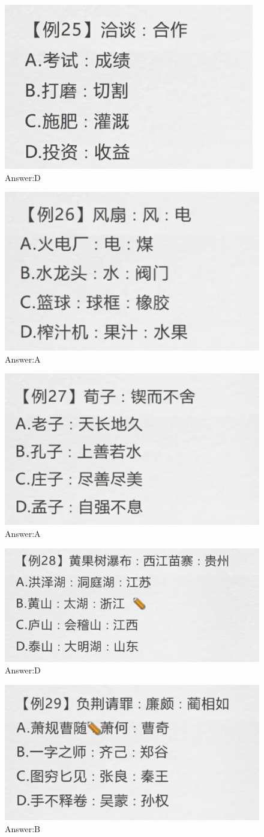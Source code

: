 \documentclass{article}
\numberwithin{equation}{section}						%
\numberwithin{figure}{section}							%
\begin{document}
\begin{sloppypar}
\begin{figure}[H]
     \centering
     \includegraphics[width=0.4\linewidth]{125.png}
		\caption{Answer:D}
\end{figure}


\begin{figure}[H]
     \centering
     \includegraphics[width=0.4\linewidth]{126.png}
		\caption{Answer:A}
\end{figure}

\begin{figure}[H]
     \centering
     \includegraphics[width=0.4\linewidth]{127.png}
		\caption{Answer:A}
\end{figure}

\begin{figure}[H]
     \centering
     \includegraphics[width=0.4\linewidth]{128.png}
		\caption{Answer:D}
\end{figure}


\begin{figure}[H]
     \centering
     \includegraphics[width=0.4\linewidth]{129.png}
		\caption{Answer:B}
\end{figure}


\end{sloppypar}
\end{document}
